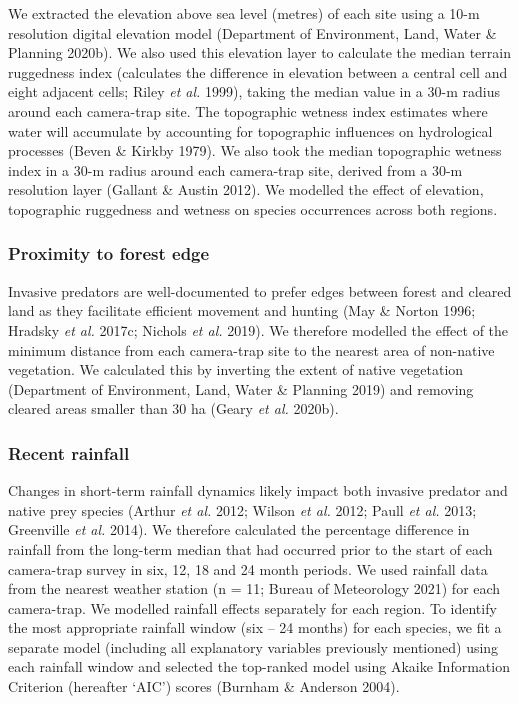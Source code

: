 \documentclass[11pt,a4paper,titlepage,twoside,openright]{style/unimelbthesis}
\begin{document}
\begin{mainmatter}
We extracted the elevation above sea level (metres) of each site using a 10-m resolution digital elevation model (Department of Environment, Land, Water \& Planning 2020b). We also used this elevation layer to calculate the median terrain ruggedness index (calculates the difference in elevation between a central cell and eight adjacent cells; Riley \emph{et al.} 1999), taking the median value in a 30-m radius around each camera-trap site. The topographic wetness index estimates where water will accumulate by accounting for topographic influences on hydrological processes (Beven \& Kirkby 1979). We also took the median topographic wetness index in a 30-m radius around each camera-trap site, derived from a 30-m resolution layer (Gallant \& Austin 2012). We modelled the effect of elevation, topographic ruggedness and wetness on species occurrences across both regions.

\hypertarget{proximity-to-forest-edge}{%
\subsubsection{Proximity to forest edge}\label{proximity-to-forest-edge}}

Invasive predators are well-documented to prefer edges between forest and cleared land as they facilitate efficient movement and hunting (May \& Norton 1996; Hradsky \emph{et al.} 2017c; Nichols \emph{et al.} 2019). We therefore modelled the effect of the minimum distance from each camera-trap site to the nearest area of non-native vegetation. We calculated this by inverting the extent of native vegetation (Department of Environment, Land, Water \& Planning 2019) and removing cleared areas smaller than 30 ha (Geary \emph{et al.} 2020b).

\hypertarget{recent-rainfall}{%
\subsubsection{Recent rainfall}\label{recent-rainfall}}

Changes in short-term rainfall dynamics likely impact both invasive predator and native prey species (Arthur \emph{et al.} 2012; Wilson \emph{et al.} 2012; Paull \emph{et al.} 2013; Greenville \emph{et al.} 2014). We therefore calculated the percentage difference in rainfall from the long-term median that had occurred prior to the start of each camera-trap survey in six, 12, 18 and 24 month periods. We used rainfall data from the nearest weather station (n = 11; Bureau of Meteorology 2021) for each camera-trap. We modelled rainfall effects separately for each region. To identify the most appropriate rainfall window (six -- 24 months) for each species, we fit a separate model (including all explanatory variables previously mentioned) using each rainfall window and selected the top-ranked model using Akaike Information Criterion (hereafter `AIC') scores (Burnham \& Anderson 2004).


\end{mainmatter}
\end{document}

